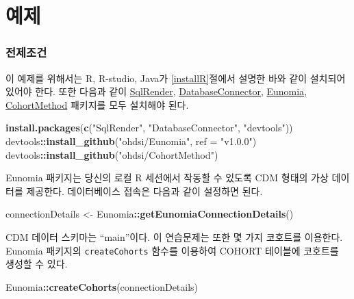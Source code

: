 \documentclass[10.5pt]{book}
\newenvironment{Shaded}{\begin{snugshade}}{\end{snugshade}}
\newcommand{\KeywordTok}[1]{\textcolor[rgb]{0.13,0.29,0.53}{\textbf{#1}}}
\newcommand{\DataTypeTok}[1]{\textcolor[rgb]{0.13,0.29,0.53}{#1}}
\newcommand{\StringTok}[1]{\textcolor[rgb]{0.31,0.60,0.02}{#1}}
\newcommand{\OperatorTok}[1]{\textcolor[rgb]{0.81,0.36,0.00}{\textbf{#1}}}
\newcommand{\NormalTok}[1]{#1}
\theoremstyle{definition}
\theoremstyle{definition}
\theoremstyle{definition}
\theoremstyle{remark}
\begin{document}
\section{예제}\label{-7}

\subsubsection*{전제조건}\label{-5}

이 예제를 위해서는 R, R-studio, Java가 \ref{installR}절에서 설명한 바와
같이 설치되어 있어야 한다. 또한 다음과 같이
\href{https://ohdsi.github.io/SqlRender/}{SqlRender},
\href{https://ohdsi.github.io/DatabaseConnector/}{DatabaseConnector},
\href{https://ohdsi.github.io/Eunomia/}{Eunomia},
\href{https://ohdsi.github.io/CohortMethod/}{CohortMethod} 패키지를 모두
설치해야 된다.

\begin{Shaded}
\begin{Highlighting}[]
\KeywordTok{install.packages}\NormalTok{(}\KeywordTok{c}\NormalTok{(}\StringTok{"SqlRender"}\NormalTok{, }\StringTok{"DatabaseConnector"}\NormalTok{, }\StringTok{"devtools"}\NormalTok{))}
\NormalTok{devtools}\OperatorTok{::}\KeywordTok{install_github}\NormalTok{(}\StringTok{"ohdsi/Eunomia"}\NormalTok{, }\DataTypeTok{ref =} \StringTok{"v1.0.0"}\NormalTok{)}
\NormalTok{devtools}\OperatorTok{::}\KeywordTok{install_github}\NormalTok{(}\StringTok{"ohdsi/CohortMethod"}\NormalTok{)}
\end{Highlighting}
\end{Shaded}

Eunomia 패키지는 당신의 로컬 R 세션에서 작동할 수 있도록 CDM 형태의 가상
데이터를 제공한다. 데이터베이스 접속은 다음과 같이 설정하면 된다.

\begin{Shaded}
\begin{Highlighting}[]
\NormalTok{connectionDetails <-}\StringTok{ }\NormalTok{Eunomia}\OperatorTok{::}\KeywordTok{getEunomiaConnectionDetails}\NormalTok{()}
\end{Highlighting}
\end{Shaded}

CDM 데이터 스키마는 ``main''이다. 이 연습문제는 또한 몇 가지 코호트를
이용한다. Eunomia 패키지의 \texttt{createCohorts} 함수를 이용하여 COHORT
테이블에 코호트를 생성할 수 있다.

\begin{Shaded}
\begin{Highlighting}[]
\NormalTok{Eunomia}\OperatorTok{::}\KeywordTok{createCohorts}\NormalTok{(connectionDetails)}
\end{Highlighting}
\end{Shaded}
\end{document}
